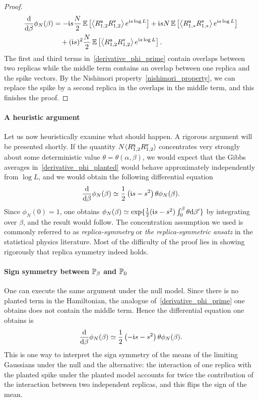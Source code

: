 \documentclass[final,12pt]{colt2018} %
\newcommand{\utt}{\textup{\texttt{u}}}
\newcommand{\vtt}{\textup{\texttt{v}}}
\begin{document}
\begin{proof}
\begin{align}
\frac{\rmd}{\rmd \beta} \phi_N(\beta)  &= -\imnb s\frac{N}{2} \E\left[\left \langle R^{\utt}_{1,2}R^{\vtt}_{1,2}\right \rangle e^{\imnb s \log L}\right]
+\imnb s N \E\left[\left \langle R^{\utt}_{1,*}R^{\vtt}_{1,*}\right \rangle e^{\imnb s \log L}\right]\\
&~~~+ (\imnb s)^2 \frac{N}{2} \E\left[\left \langle R^{\utt}_{1,2}R^{\vtt}_{1,2}\right \rangle e^{\imnb s \log L}\right].\nonumber
\end{align}
The first and third terms in~\eqref{derivative_phi_prime} contain overlaps between two replicas while the middle term contains an overlap between one replica and the spike vectors. By the Nishimori property~\eqref{nishimori_property}, we can replace the spike by a second replica in the overlaps in the middle term, and this finishes the proof.
\end{proof} 
\paragraph{A heuristic argument} Let us now heuristically examine what should happen. A rigorous argument will be presented shortly.
If the quantity $N \langle R^{\utt}_{1,2}R^{\vtt}_{1,2} \rangle$ concentrates very strongly about some deterministic value $\theta = \theta(\alpha,\beta)$, we would expect that the Gibbs averages in~\eqref{derivative_phi_planted} would behave approximately independently from $\log L$, and we would obtain the following differential equation
\[\frac{\rmd}{\rmd \beta} \phi_N(\beta) \simeq \half\left(\imnb s - s^2\right)\theta\phi_N(\beta).\]
Since $\phi_N(0)=1$, one obtains  $\phi_N(\beta) \simeq \exp\{\half(\imnb s - s^2) \int_0^\beta \theta \rmd\beta'\}$ by integrating over $\beta$, and the result would follow. The concentration assumption we used is commonly referred to as \emph{replica-symmetry} or \emph{the replica-symmetric ansatz} in the statistical physics literature. Most of the difficulty of the proof lies in showing rigorously that replica symmetry indeed holds. 

\paragraph{Sign symmetry between $\P_{\beta}$ and $\P_{0}$} One can execute the same argument under the null model. Since there is no planted term in the Hamiltonian, the analogue of~\eqref{derivative_phi_prime} one obtains does not contain the middle term. Hence the differential equation one obtains is
\[\frac{\rmd}{\rmd \beta} \phi_N(\beta) \simeq \half\left(-\imnb s - s^2\right)\theta\phi_N(\beta).\]  
This is one way to interpret the sign symmetry of the means of the limiting Gaussians under the null and the alternative: the interaction of one replica with the planted spike under the planted model accounts for twice the contribution of the interaction between two independent replicas, and this flips the sign of the mean. 
\end{document}

